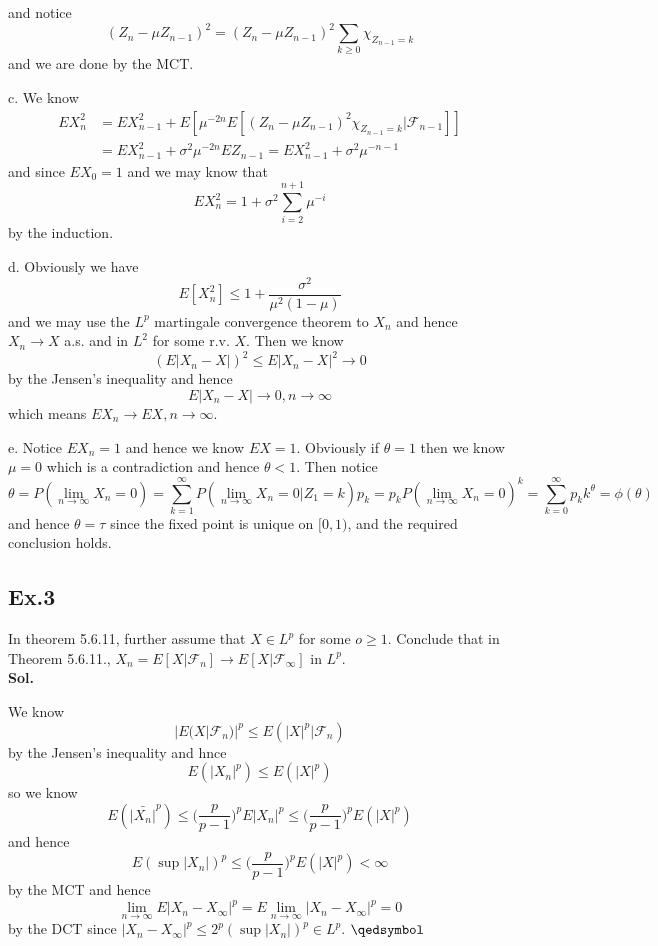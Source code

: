 \documentclass[lang=en,11pt,a4paper,citestyle =authoryear]{elegantpaper}
\newcommand{\prvd}{$\hfill \qedsymbol$}
\newcommand{\F}{\mathcal{F}}
\begin{document}
and notice
\[(Z_n-\mu Z_{n-1})^2 = (Z_n - \mu Z_{n-1})^2\sum\limits_{k\geq 0}\chi_{Z_{n-1} = k}\]
and we are done by the MCT.\par
c. We know
\[
\begin{aligned}
EX_n^2 &= EX_{n-1}^2 + E[\mu^{-2n}E[(Z_n-\mu Z_{n-1})^2\chi_{Z_{n-1} = k}|\F_{n-1}]] \\ &= EX_{n-1}^2 + \sigma^2 \mu^{-2n}EZ_{n-1} = EX_{n-1}^2 + \sigma^2\mu^{-n-1}
\end{aligned}
\]
and since $EX_0 = 1$ and we may know that
\[EX_n^2 = 1 + \sigma^2\sum\limits_{i=2}^{n+1}\mu^{-i}\]
by the induction.\par
d. Obviously we have
\[E[X_n^2] \leq 1 + \dfrac{\sigma^2}{\mu^2(1-\mu)}\]
and we may use the $L^p$ martingale convergence theorem to $X_n$ and hence $X_n \to X$ a.s. and in $L^2$ for some r.v. $X$. Then we know
\[(E|X_n-X|)^2 \leq E|X_n-X|^2 \to 0\]
by the Jensen's inequality and hence
\[E|X_n-X| \to 0, n\to\infty\]
which means $EX_n \to EX, n\to\infty$.\par
e. Notice $EX_n = 1$ and hence we know $EX = 1$. Obviously if $\theta = 1$ then we know $\mu = 0$ which is a contradiction and hence $\theta < 1$. Then notice
\[
\theta = P(\lim_{n\to\infty}X_n = 0) = \sum\limits_{k=1}^{\infty}P(\lim_{n\to\infty}X_n = 0|Z_1 = k)p_k = p_kP(\lim_{n\to\infty}X_n = 0)^k = \sum\limits_{k=0}^{\infty}p_kk^{\theta} = \phi(\theta)
\]
and hence $\theta = \tau$ since the fixed point is unique on $[0,1)$, and the required conclusion holds.
\vspace{0.5em}

\subsection*{Ex.3}
In theorem 5.6.11, further assume that $X\in L^p$ for some $o\geq 1$. Conclude that in Theorem 5.6.11., $X_n = E[X|\F_n] \to E[X|\F_{\infty}]$ in $L^p$.
\vspace{0.5em}\\
\textbf{Sol.} \par
We know
\[|E(X|\F_n)|^p \leq E(|X|^p|\F_n)\]
by the Jensen's inequality and hnce
\[E(|X_n|^p) \leq E(|X|^p)\]
so we know
\[E(\bar{|X_n|}^p) \leq \Big(\dfrac{p}{p-1}\Big)^p E|X_n|^p \leq\Big(\dfrac{p}{p-1}\Big)^pE(|X|^p) \]
and hence
\[E(\sup|X_n|)^p \leq \Big(\dfrac{p}{p-1}\Big)^pE(|X|^p) < \infty\]
by the MCT and hence
\[\lim_{n\to\infty}E|X_n-X_{\infty}|^p = E\lim_{n\to\infty}|X_n-X_{\infty}|^p = 0\]
by the DCT since $|X_n-X_{\infty}|^p \leq 2^p(\sup|X_n|)^p \in L^p$.
\prvd
\vspace{0.5em}
\end{document}
